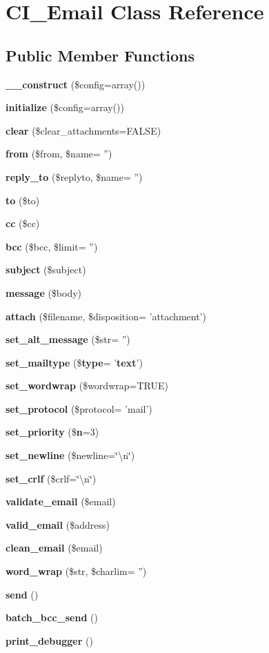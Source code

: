 \section{C\-I\-\_\-\-Email Class Reference}
\label{class_c_i___email}
\subsection*{Public Member Functions}
\begin{DoxyCompactItemize}
\item 
{\bf \-\_\-\-\_\-construct} (\$config=array())
\item 
{\bf initialize} (\$config=array())
\item 
{\bf clear} (\$clear\-\_\-attachments=F\-A\-L\-S\-E)
\item 
{\bf from} (\$from, \$name= '')
\item 
{\bf reply\-\_\-to} (\$replyto, \$name= '')
\item 
{\bf to} (\$to)
\item 
{\bf cc} (\$cc)
\item 
{\bf bcc} (\$bcc, \$limit= '')
\item 
{\bf subject} (\$subject)
\item 
{\bf message} (\$body)
\item 
{\bf attach} (\$filename, \$disposition= 'attachment')
\item 
{\bf set\-\_\-alt\-\_\-message} (\$str= '')
\item 
{\bf set\-\_\-mailtype} (\${\bf type}= '{\bf text}')
\item 
{\bf set\-\_\-wordwrap} (\$wordwrap=T\-R\-U\-E)
\item 
{\bf set\-\_\-protocol} (\$protocol= 'mail')
\item 
{\bf set\-\_\-priority} (\${\bf n}=3)
\item 
{\bf set\-\_\-newline} (\$newline=\char`\"{}\textbackslash{}n\char`\"{})
\item 
{\bf set\-\_\-crlf} (\$crlf=\char`\"{}\textbackslash{}n\char`\"{})
\item 
{\bf validate\-\_\-email} (\$email)
\item 
{\bf valid\-\_\-email} (\$address)
\item 
{\bf clean\-\_\-email} (\$email)
\item 
{\bf word\-\_\-wrap} (\$str, \$charlim= '')
\item 
{\bf send} ()
\item 
{\bf batch\-\_\-bcc\-\_\-send} ()
\item 
{\bf print\-\_\-debugger} ()
\end{DoxyCompactItemize}
